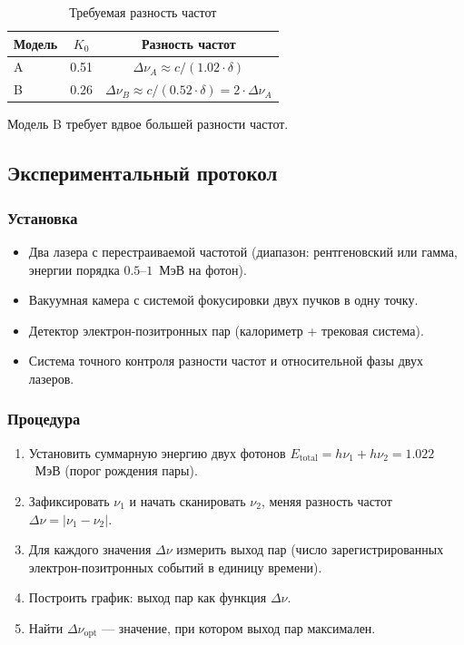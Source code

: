 \documentclass[12pt,a4paper]{article}
\begin{document}
\begin{table}[h]
    \centering
    \caption{Требуемая разность частот}
    \begin{tabular}{lcc}
        \toprule
        Модель & $K_0$ & Разность частот \\
        \midrule
        A & 0.51 & $\Delta\nu_A \approx c / (1.02 \cdot \delta)$ \\
        B & 0.26 & $\Delta\nu_B \approx c / (0.52 \cdot \delta) = 2 \cdot \Delta\nu_A$ \\
        \bottomrule
    \end{tabular}
    \label{tab:frequencies_exp}
\end{table}

Модель B требует вдвое большей разности частот.

\subsection{Экспериментальный протокол}

\subsubsection{Установка}
\begin{itemize}
    \item Два лазера с перестраиваемой частотой (диапазон: рентгеновский или гамма, энергии порядка $0.5$--$1$~МэВ на фотон).
    \item Вакуумная камера с системой фокусировки двух пучков в одну точку.
    \item Детектор электрон-позитронных пар (калориметр + трековая система).
    \item Система точного контроля разности частот и относительной фазы двух лазеров.
\end{itemize}

\subsubsection{Процедура}
\begin{enumerate}[label=\arabic*.]
    \item Установить суммарную энергию двух фотонов $E_{\text{total}} = h\nu_1 + h\nu_2 = 1.022$~МэВ (порог рождения пары).
    \item Зафиксировать $\nu_1$ и начать сканировать $\nu_2$, меняя разность частот $\Delta\nu = |\nu_1 - \nu_2|$.
    \item Для каждого значения $\Delta\nu$ измерить выход пар (число зарегистрированных электрон-позитронных событий в единицу времени).
    \item Построить график: выход пар как функция $\Delta\nu$.
    \item Найти $\Delta\nu_{\text{opt}}$ — значение, при котором выход пар максимален.
\end{enumerate}
\end{document}
